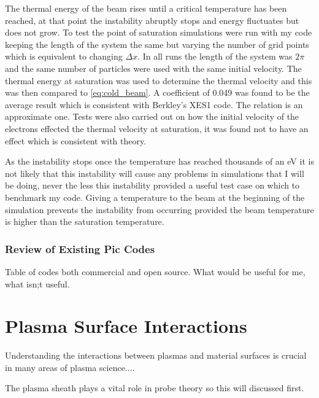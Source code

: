 \documentclass[12pt]{article}
\begin{document}
\newpage
The thermal energy of the beam rises until a critical temperature has been reached, at that point the instability abruptly stops and energy fluctuates but does not grow. To test the point of saturation simulations were run with my code keeping the length of the system the same but varying the number of grid points which is equivalent to changing $\Delta x$. In all runs the length of the system was $2\pi$ and the same number of particles were used with the same initial velocity. The thermal energy at saturation was used to determine the thermal velocity and this was then compared to \eqref{eq:cold_beam}. A coefficient of 0.049 was found to be the average result which is consistent with Berkley's XES1 code. The relation is an approximate one. Tests were also carried out on how the initial velocity of the electrons effected the thermal velocity at saturation, it was found not to have an effect which is consistent with theory.

As the instability stops once the temperature has reached thousands of an eV it is not likely that this instability will cause any problems in simulations that I will be doing, never the less this instability provided a useful test case on which to benchmark my code. Giving a temperature to the beam at the beginning of the simulation prevents the instability from occurring provided the beam temperature is higher than the saturation temperature.

\subsubsection{Review of Existing Pic Codes}
Table of codes both commercial and open source. What would be useful for me, what isn;t useful. 

\section{Plasma Surface Interactions}
Understanding the interactions between plasmas and material surfaces is crucial in many areas of plasma science....%

The plasma sheath plays a vital role in probe theory so this will discussed first. 
\end{document}
